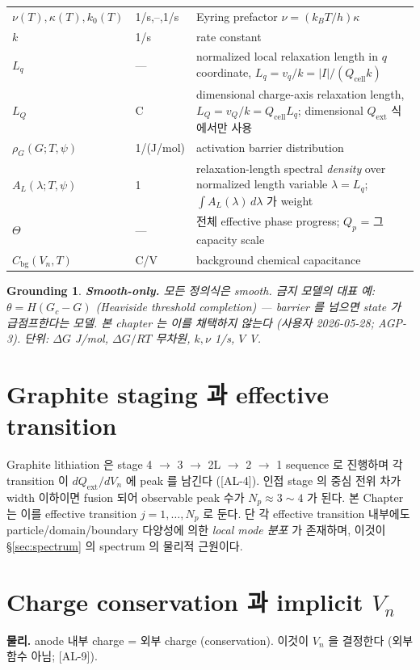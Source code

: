 \documentclass[11pt,a4paper]{article}
\newtheorem*{groundingbox}{Grounding}
\newcommand{\bg}{\mathrm{bg}}
\newcommand{\cell}{\mathrm{cell}}
\newcommand{\ext}{\mathrm{ext}}
\newcommand{\AL}[1]{\textsf{[AL-#1]}}
\begin{document}
\begin{longtable}{p{} p{} p{}}
$\nu(T),\kappa(T),k_0(T)$ & 1/s,--,1/s & Eyring prefactor $\nu=(k_BT/h)\kappa$ \\
$k$ & 1/s & rate constant \\
$L_q$ & --- & normalized local relaxation length in $q$ coordinate, $L_q=v_q/k=|I|/(Q_\cell k)$ \\
$L_Q$ & C & dimensional charge-axis relaxation length, $L_Q=v_Q/k=Q_\cell L_q$; dimensional $Q_\ext$ 식에서만 사용 \\
$\rho_G(G;T,\psi)$ & 1/(J/mol) & activation barrier distribution \\
$A_L(\lambda;T,\psi)$ & 1 & relaxation-length spectral \emph{density} over normalized length variable $\lambda=L_q$; $\int A_L(\lambda)\,d\lambda$ 가 weight \\
$\Theta$ & --- & 전체 effective phase progress; $Q_p$ = 그 capacity scale \\
$C_\bg(V_n,T)$ & C/V & background chemical capacitance \\
\bottomrule
\end{longtable}
\begin{groundingbox}
\textbf{Smooth-only.} 모든 정의식은 smooth. 금지 모델의 대표 예: $\theta=H(G_c-G)$
(Heaviside threshold completion) — barrier 를 넘으면 state 가 급점프한다는 모델. 본 chapter
는 이를 채택하지 않는다 (사용자 2026-05-28; AGP-3). 단위: $\Delta G$ J/mol, $\Delta G/RT$
무차원, $k,\nu$ 1/s, $V$ V.
\end{groundingbox}

\section{Graphite staging 과 effective transition}\label{sec:staging}
Graphite lithiation 은 stage 4 $\to$ 3 $\to$ 2L $\to$ 2 $\to$ 1 sequence 로 진행하며 각
transition 이 $dQ_\ext/dV_n$ 에 peak 를 남긴다 \cite{dahn1991,ohzuku1993,funabiki1999} (\AL{4}).
인접 stage 의 중심 전위 차가 width 이하이면 fusion 되어 observable peak 수가 $N_p\approx
3\sim4$ 가 된다. 본 Chapter 는 이를 effective transition $j=1,\dots,N_p$ 로 둔다. 단 각
effective transition 내부에도 particle/domain/boundary 다양성에 의한 \emph{local mode 분포}
가 존재하며, 이것이 \S\ref{sec:spectrum} 의 spectrum 의 물리적 근원이다.

\section{Charge conservation 과 implicit $V_n$}\label{sec:charge}
\textbf{물리.} anode 내부 charge = 외부 charge (conservation). 이것이 $V_n$ 을 결정한다
(외부 함수 아님; \AL{9}).
\end{document}
